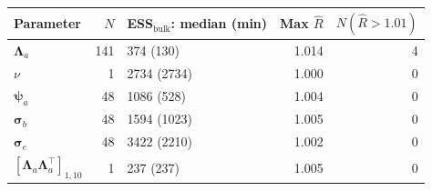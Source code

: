 
\begin{tabular}{lrlrr}
\toprule
Parameter & $N$ & ESS$_\text{bulk}$: median (min) & Max $\hat R$ & $N(\hat R{>}1.01)$\\
\midrule
$\boldsymbol\Lambda_a$ & 141 & 374 (130) & 1.014 & 4\\
$\nu$ & 1 & 2734 (2734) & 1.000 & 0\\
$\boldsymbol\psi_a$ & 48 & 1086 (528) & 1.004 & 0\\
$\boldsymbol\sigma_b$ & 48 & 1594 (1023) & 1.005 & 0\\
$\boldsymbol\sigma_e$ & 48 & 3422 (2210) & 1.002 & 0\\
$[\boldsymbol\Lambda_a\boldsymbol\Lambda_a^\top]_{1,10}$ & 1 & 237 (237) & 1.005 & 0\\
\bottomrule
\end{tabular}
